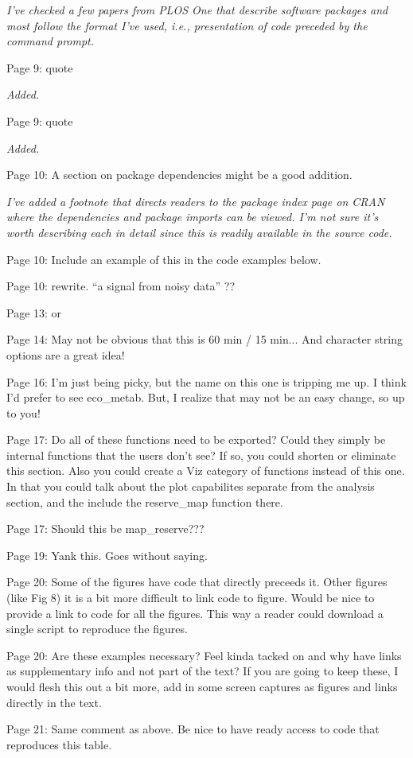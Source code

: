 \documentclass[letterpaper,12pt]{article}\usepackage[]{graphicx}\usepackage[]{color}
\begin{document}
{\it I've checked a few papers from PLOS One that describe software packages and most follow the format I've used, i.e., presentation of code preceded by the command prompt.}

Page 9: quote

{\it Added.}

Page 9: quote

{\it Added.}

Page 10: A section on package dependencies might be a good addition.

{\it I've added a footnote that directs readers to the package index page on CRAN where the dependencies and package imports can be viewed.  I'm not sure it's worth describing each in detail since this is readily available in the source code.} 

Page 10: Include an example of this in the code examples below.

Page 10: rewrite. ``a signal from noisy data'' ??

Page 13: or

Page 14: May not be obvious that this is 60 min / 15 min... And character string options are a great idea!

Page 16: I'm just being picky, but the name on this one is tripping me up. I think I'd prefer to see eco\_metab. But, I realize that may not be an easy change, so up to you!

Page 17: Do all of these functions need to be exported? Could they simply be internal functions that the users don't see? If so, you could shorten or eliminate this section. Also you could create a Viz category of functions instead of this one. In that you could talk about the plot capabilites separate from the analysis section, and the include the reserve\_map function there.

Page 17: Should this be map\_reserve???

Page 19: Yank this. Goes without saying.

Page 20: Some of the figures have code that directly preceeds it. Other figures (like Fig 8) it is a bit more difficult to link code to figure. Would be nice to provide a link to code for all the figures. This way a reader could download a single script to reproduce the figures.

Page 20: Are these examples necessary? Feel kinda tacked on and why have links as supplementary info and not part of the text? If you are going to keep these, I would flesh this out a bit more, add in some screen captures as figures and links directly in the text.

Page 21: Same comment as above. Be nice to have ready access to code that reproduces this table.
\end{document}
